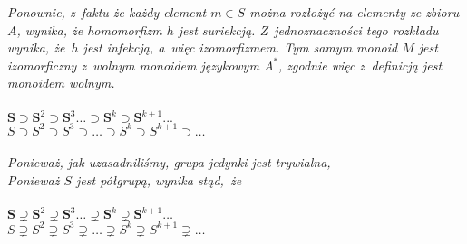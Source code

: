 \documentclass[a4paper,11pt]{article}
\begin{document}
\Powin \textit{Ponownie, z~faktu że każdy element $m \in S$ można rozłożyć na
  elementy ze zbioru $A$, wynika, że homomorfizm $h$ jest suriekcją.
  Z~jednoznaczności tego rozkładu wynika, że~$h$ jest infekcją, a~więc
  izomorfizmem. Tym samym monoid $M$ jest izomorficzny z~wolnym monoidem
  językowym $A^{ * }$, zgodnie więc z~definicją jest monoidem wolnym.} \\
 \\
\Jest  $\mathbf{S} \supset \mathbf{S}^{ 2 } \supset \mathbf{S}^{ 3 } \ldots
\supset \mathbf{S}^{ k } \supset \mathbf{S}^{ k + 1 } ...$ \\
\Powin $S \supset S^{ 2 } \supset S^{ 3 } \supset \ldots \supset S^{ k } \supset S^{ k + 1 } \supset \ldots$ \\
 \\
\Jest  \textit{Ponieważ, jak uzasadniliśmy, grupa jedynki jest trywialna,}
\\
\Powin \textit{Ponieważ $S$ jest półgrupą, wynika stąd,~że} \\
 \\
\Jest  $\mathbf{S} \supsetneq \mathbf{S}^{ 2 } \supsetneq \mathbf{S}^{ 3 } \ldots
\supsetneq \mathbf{S}^{ k } \supsetneq \mathbf{S}^{ k + 1 } \ldots$ \\[0.3em]
\Powin $S \supsetneq S^{ 2 } \supsetneq S^{ 3 } \supsetneq \ldots \supsetneq S^{ k } \supsetneq S^{ k + 1 } \supsetneq \ldots$ \\



\vspace{\spaceTwo}












{}






\end{document}
